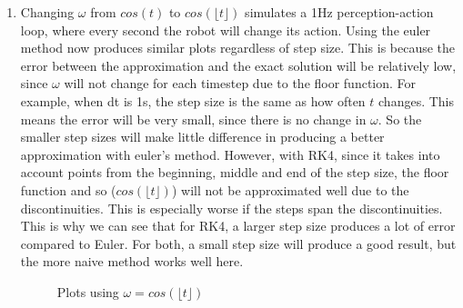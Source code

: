 \documentclass[12pt,a4paper]{article}
\begin{document}
\begin{enumerate}[label=(\alph*)]
	\item Changing $\omega$ from $cos(t)$ to $cos(\lfloor t \rfloor)$ simulates a 1Hz perception-action loop, where every second the robot will change its action. Using the euler method now produces similar plots regardless of step size. This is because the error between the approximation and the exact solution will be relatively low, since $\omega$ will not change for each timestep due to the floor function. For example, when dt is 1s, the step size is the same as how often $t$ changes. This means the error will be very small, since there is no change in $\omega$. So the smaller step sizes will make little difference in producing a better approximation with euler's method. However, with RK4, since it takes into account points from the beginning, middle and end of the step size, the floor function and so ($cos(\lfloor t \rfloor)$) will not be approximated well due to the discontinuities. This is especially worse if the steps span the discontinuities. This is why we can see that for RK4, a larger step size produces a lot of error compared to Euler. For both, a small step size will produce a good result, but the more naive method works well here.
		\begin{figure}[h!]
		\centering
		\qquad
		\caption{Plots using $\omega=cos(\lfloor t \rfloor)$}%
		\label{fig:floor}%
		\end{figure}

\end{enumerate}
\end{document}
